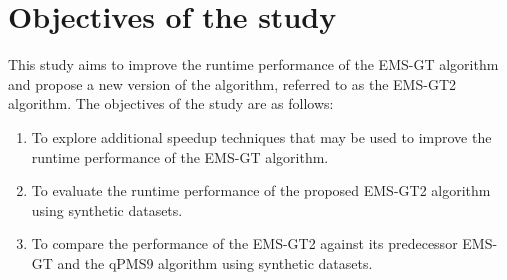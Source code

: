 \section{Objectives of the study}

This study aims to improve the runtime performance of the EMS-GT algorithm and propose a new version of the algorithm, referred to as the EMS-GT2 algorithm. The objectives of the study are as follows:

\begin{enumerate}
	\item To explore additional speedup techniques that may be used to improve the runtime performance of the EMS-GT algorithm.

	\item To evaluate the runtime performance of the proposed EMS-GT2 algorithm using synthetic datasets.

	\item To compare the performance of the EMS-GT2 against its predecessor EMS-GT and the qPMS9 algorithm using synthetic datasets.
\end{enumerate}